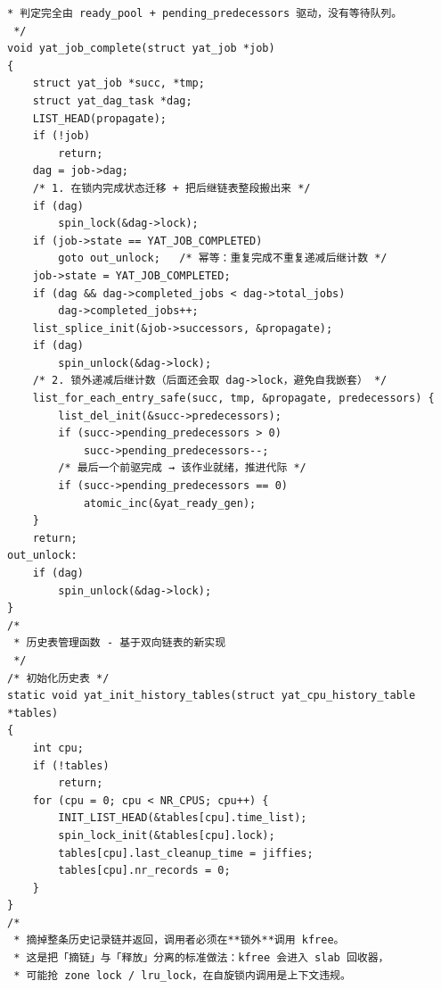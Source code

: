 \documentclass[10pt,a4paper]{article}
\newenvironment{yatpage}{\vspace*{0pt}}{\par}
\begin{document}
\begin{yatpage}
\begin{Verbatim}[fontsize=\fontsize{8.2}{9.8}\selectfont]
 * 判定完全由 ready_pool + pending_predecessors 驱动，没有等待队列。
 */
void yat_job_complete(struct yat_job *job)
{
    struct yat_job *succ, *tmp;
    struct yat_dag_task *dag;
    LIST_HEAD(propagate);
    if (!job)
        return;
    dag = job->dag;
    /* 1. 在锁内完成状态迁移 + 把后继链表整段搬出来 */
    if (dag)
        spin_lock(&dag->lock);
    if (job->state == YAT_JOB_COMPLETED)
        goto out_unlock;   /* 幂等：重复完成不重复递减后继计数 */
    job->state = YAT_JOB_COMPLETED;
    if (dag && dag->completed_jobs < dag->total_jobs)
        dag->completed_jobs++;
    list_splice_init(&job->successors, &propagate);
    if (dag)
        spin_unlock(&dag->lock);
    /* 2. 锁外递减后继计数（后面还会取 dag->lock，避免自我嵌套） */
    list_for_each_entry_safe(succ, tmp, &propagate, predecessors) {
        list_del_init(&succ->predecessors);
        if (succ->pending_predecessors > 0)
            succ->pending_predecessors--;
        /* 最后一个前驱完成 → 该作业就绪，推进代际 */
        if (succ->pending_predecessors == 0)
            atomic_inc(&yat_ready_gen);
    }
    return;
out_unlock:
    if (dag)
        spin_unlock(&dag->lock);
}
/*
 * 历史表管理函数 - 基于双向链表的新实现
 */
/* 初始化历史表 */
static void yat_init_history_tables(struct yat_cpu_history_table *tables)
{
    int cpu;
    if (!tables)
        return;
    for (cpu = 0; cpu < NR_CPUS; cpu++) {
        INIT_LIST_HEAD(&tables[cpu].time_list);
        spin_lock_init(&tables[cpu].lock);
        tables[cpu].last_cleanup_time = jiffies;
        tables[cpu].nr_records = 0;
    }
}
/*
 * 摘掉整条历史记录链并返回，调用者必须在**锁外**调用 kfree。
 * 这是把「摘链」与「释放」分离的标准做法：kfree 会进入 slab 回收器，
 * 可能抢 zone lock / lru_lock，在自旋锁内调用是上下文违规。
\end{Verbatim}
\end{yatpage}
\newpage
\end{document}
